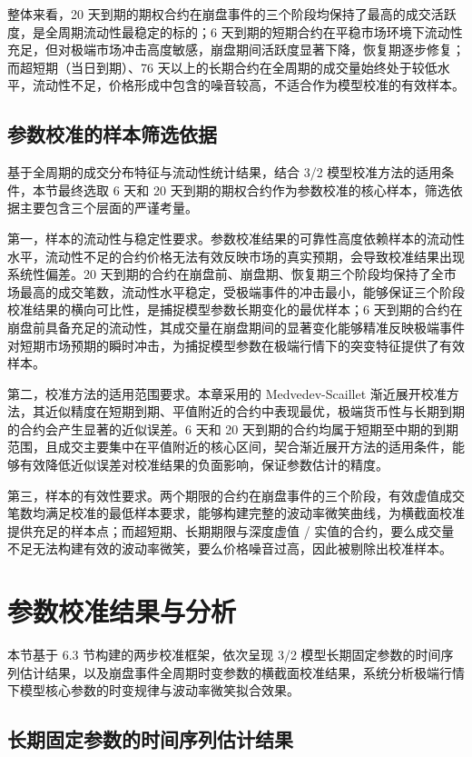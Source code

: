 整体来看，20 天到期的期权合约在崩盘事件的三个阶段均保持了最高的成交活跃度，是全周期流动性最稳定的标的；6 天到期的短期合约在平稳市场环境下流动性充足，但对极端市场冲击高度敏感，崩盘期间活跃度显著下降，恢复期逐步修复；而超短期（当日到期）、76 天以上的长期合约在全周期的成交量始终处于较低水平，流动性不足，价格形成中包含的噪音较高，不适合作为模型校准的有效样本。
\subsection{参数校准的样本筛选依据}

基于全周期的成交分布特征与流动性统计结果，结合 3/2 模型校准方法的适用条件，本节最终选取 6 天和 20 天到期的期权合约作为参数校准的核心样本，筛选依据主要包含三个层面的严谨考量。

第一，样本的流动性与稳定性要求。参数校准结果的可靠性高度依赖样本的流动性水平，流动性不足的合约价格无法有效反映市场的真实预期，会导致校准结果出现系统性偏差。20 天到期的合约在崩盘前、崩盘期、恢复期三个阶段均保持了全市场最高的成交笔数，流动性水平稳定，受极端事件的冲击最小，能够保证三个阶段校准结果的横向可比性，是捕捉模型参数长期变化的最优样本；6 天到期的合约在崩盘前具备充足的流动性，其成交量在崩盘期间的显著变化能够精准反映极端事件对短期市场预期的瞬时冲击，为捕捉模型参数在极端行情下的突变特征提供了有效样本。

第二，校准方法的适用范围要求。本章采用的 Medvedev-Scaillet 渐近展开校准方法，其近似精度在短期到期、平值附近的合约中表现最优，极端货币性与长期到期的合约会产生显著的近似误差。6 天和 20 天到期的合约均属于短期至中期的到期范围，且成交主要集中在平值附近的核心区间，契合渐近展开方法的适用条件，能够有效降低近似误差对校准结果的负面影响，保证参数估计的精度。

第三，样本的有效性要求。两个期限的合约在崩盘事件的三个阶段，有效虚值成交笔数均满足校准的最低样本要求，能够构建完整的波动率微笑曲线，为横截面校准提供充足的样本点；而超短期、长期期限与深度虚值 / 实值的合约，要么成交量不足无法构建有效的波动率微笑，要么价格噪音过高，因此被剔除出校准样本。

\section{参数校准结果与分析}
本节基于 6.3 节构建的两步校准框架，依次呈现 3/2 模型长期固定参数的时间序列估计结果，以及崩盘事件全周期时变参数的横截面校准结果，系统分析极端行情下模型核心参数的时变规律与波动率微笑拟合效果。

\subsection{长期固定参数的时间序列估计结果}

